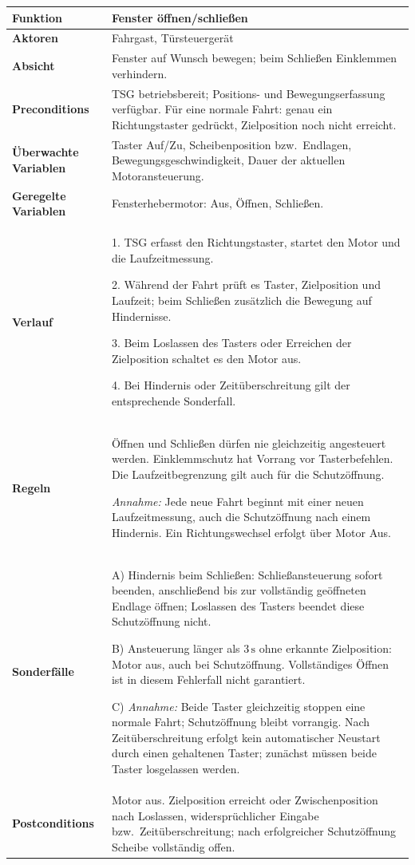 \begin{loesung}
\begingroup
\small
\renewcommand{\arraystretch}{1.15}
\begin{tabularx}{\linewidth}{|p{3.3cm}|X|}
\hline
\textbf{Funktion} & \textbf{Fenster öffnen/schließen} \\ \hline
\textbf{Aktoren} & Fahrgast, Türsteuergerät \\ \hline
\textbf{Absicht} & Fenster auf Wunsch bewegen; beim Schließen Einklemmen verhindern. \\ \hline
\textbf{Preconditions} & TSG betriebsbereit; Positions- und Bewegungserfassung verfügbar. Für eine normale Fahrt: genau ein Richtungstaster gedrückt, Zielposition noch nicht erreicht. \\ \hline
\textbf{Überwachte Variablen} & Taster Auf/Zu, Scheibenposition bzw.\ Endlagen, Bewegungsgeschwindigkeit, Dauer der aktuellen Motoransteuerung. \\ \hline
\textbf{Geregelte Variablen} & Fensterhebermotor: Aus, Öffnen, Schließen. \\ \hline
\textbf{Verlauf} &
1. TSG erfasst den Richtungstaster, startet den Motor und die Laufzeitmessung.
\par 2. Während der Fahrt prüft es Taster, Zielposition und Laufzeit; beim Schließen zusätzlich die Bewegung auf Hindernisse.
\par 3. Beim Loslassen des Tasters oder Erreichen der Zielposition schaltet es den Motor aus.
\par 4. Bei Hindernis oder Zeitüberschreitung gilt der entsprechende Sonderfall. \\ \hline
\textbf{Regeln} &
Öffnen und Schließen dürfen nie gleichzeitig angesteuert werden. Einklemmschutz hat Vorrang vor Tasterbefehlen. Die Laufzeitbegrenzung gilt auch für die Schutzöffnung.
\par \emph{Annahme:} Jede neue Fahrt beginnt mit einer neuen Laufzeitmessung, auch die Schutzöffnung nach einem Hindernis. Ein Richtungswechsel erfolgt über Motor Aus. \\ \hline
\textbf{Sonderfälle} &
A) Hindernis beim Schließen: Schließansteuerung sofort beenden, anschließend bis zur vollständig geöffneten Endlage öffnen; Loslassen des Tasters beendet diese Schutzöffnung nicht.
\par B) Ansteuerung länger als $3\,\mathrm{s}$ ohne erkannte Zielposition: Motor aus, auch bei Schutzöffnung. Vollständiges Öffnen ist in diesem Fehlerfall nicht garantiert.
\par C) \emph{Annahme:} Beide Taster gleichzeitig stoppen eine normale Fahrt; Schutzöffnung bleibt vorrangig. Nach Zeitüberschreitung erfolgt kein automatischer Neustart durch einen gehaltenen Taster; zunächst müssen beide Taster losgelassen werden. \\ \hline
\textbf{Postconditions} & Motor aus. Zielposition erreicht oder Zwischenposition nach Loslassen, widersprüchlicher Eingabe bzw.\ Zeitüberschreitung; nach erfolgreicher Schutzöffnung Scheibe vollständig offen. \\ \hline
\end{tabularx}
\endgroup


\end{loesung}
